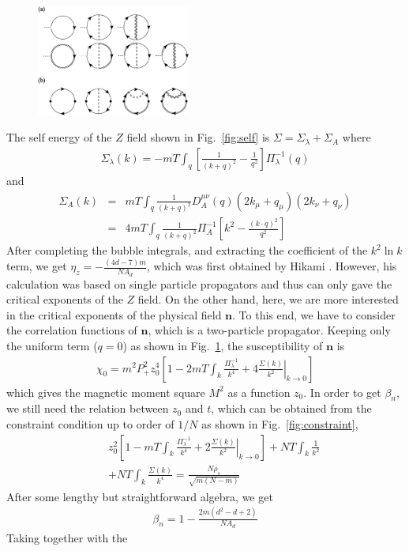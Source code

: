 \documentclass[aps,twocolumn,superscriptaddress]{revtex4-1}
\newcommand{\bea}{\begin{eqnarray}}
\newcommand{\eea}{\end{eqnarray}}
\newcommand{\bn}{\mathbf{n}}
\begin{document}
\begin{figure}
\includegraphics[width=0.45\textwidth]{suscept.eps}
\caption{\label{fig:suscept}}
\end{figure}
The self energy of the $Z$ field shown in Fig.~\ref{fig:self} is $\Sigma=\Sigma_\lambda+\Sigma_A$ where \bea
\Sigma_\lambda(k)=-mT\int_q \left[\frac{1}{(k+q)^2}-\frac{1}{q^2}\right]\Pi_\lambda^{-1}(q) \eea and \bea \Sigma_A(k)
&=& mT\int_q \frac{1}{(k+q)^2} D_A^{\mu\nu}(q) (2k_\mu+q_\mu) (2k_\nu+q_\nu) \nonumber \\&=& 4mT\int_q
\frac{1}{(k+q)^2}\Pi_A^{-1}\left[ k^2-\frac{(k\cdot q)^2}{q^2} \right] \eea After completing the bubble integrals, and
extracting the coefficient of the $k^2\ln k$ term, we get $\eta_z=-\frac{(4d-7)m}{NA_d}$, which was first obtained by
Hikami \cite{hikami1980}. However, his calculation was based on single particle propagators and thus can only gave the
critical exponents of the $Z$ field. On the other hand, here, we are more interested in the critical exponents of the
physical field $\bn$. To this end, we have to consider the correlation functions of $\bn$, which is a two-particle
propagator. Keeping only the uniform term ($q=0$) as shown in Fig.~\ref{fig:suscept}, the susceptibility of $\bn$ is
\bea \chi_0=m^2P_+^2 z_0^4\left[ 1-  2mT\int_k \frac{\Pi_\lambda^{-1}}{k^4} + 4
\left.\frac{\Sigma(k)}{k^2}\right|_{k\rightarrow0} \right] \eea which gives the magnetic moment square $M^2$ as a
function $z_0$. In order to get $\beta_n$, we still need the relation between $z_0$ and $t$, which can be obtained
from the constraint condition up to order of $1/N$ as shown in Fig.~\ref{fig:constraint}, \bea &&z_0^2 \left[ 1-
mT\int_k \frac{\Pi_\lambda^{-1}}{k^4} + 2 \left.\frac{\Sigma(k)}{k^2}\right|_{k\rightarrow0}\right] + NT\int_k
\frac{1}{k^2} \nonumber\\&&+ NT\int_k \frac{\Sigma(k)}{k^4} = \frac{N\rho_s}{\sqrt{m(N-m)}} \eea After some lengthy
but straightforward algebra, we get \bea \beta_n=1-\frac{2m(d^2-d+2)}{NA_d} \eea Taking together with the
\end{document}
